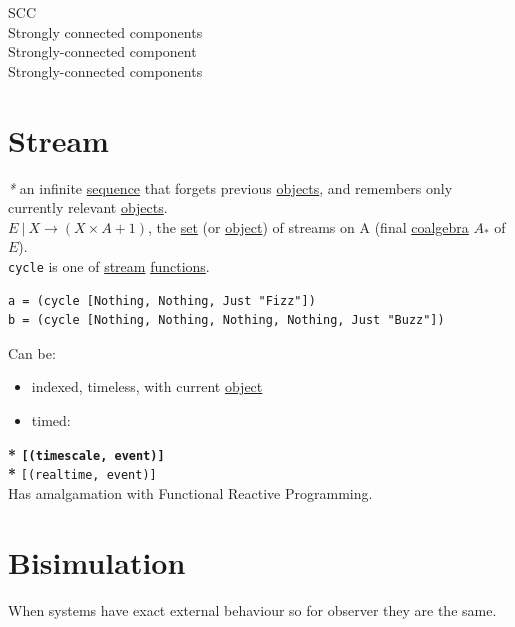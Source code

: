 \documentclass[a4paper,14pt,oneside]{book}
\begin{document}
\label{org1a4418d}SCC\\
\label{orgd62a1dc}Strongly connected components\\
\label{orgea5b2e3}Strongly-connected component\\
\label{orged43c61}Strongly-connected components\\

\chapter{\label{org47d6769}Stream}
\label{sec:orgde0645d}
\emph{*} an infinite \hyperref[org5895702]{sequence} that forgets previous \hyperref[orgd42a7f2]{objects}, and remembers only currently relevant \hyperref[orgd42a7f2]{objects}.\\

\(E \ | \ X \to (X \times A + 1)\), the \hyperref[org0f7f8fa]{set} (or \hyperref[orgef6fa9d]{object}) of streams on A (final \hyperref[orgca879f8]{coalgebra} \(A_{*}\) of \(E\)).\\

\texttt{cycle} is one of \hyperref[org47d6769]{stream} \hyperref[org2d0eb2e]{functions}.\\
\begin{verbatim}
a = (cycle [Nothing, Nothing, Just "Fizz"])
b = (cycle [Nothing, Nothing, Nothing, Nothing, Just "Buzz"])
\end{verbatim}

Can be:\\
\begin{itemize}
\item indexed, timeless, with current \hyperref[orgef6fa9d]{object}\\
\item timed:\\
\end{itemize}
\textbf{* \texttt{[(timescale, event)]}\\
*} \texttt{[(realtime, event)]}\\

Has amalgamation with Functional Reactive Programming.\\

\chapter{\label{orgc8d73a6}Bisimulation}
\label{sec:org353f737}
When systems have exact external behaviour so for observer they are the same.\\
\end{document}
